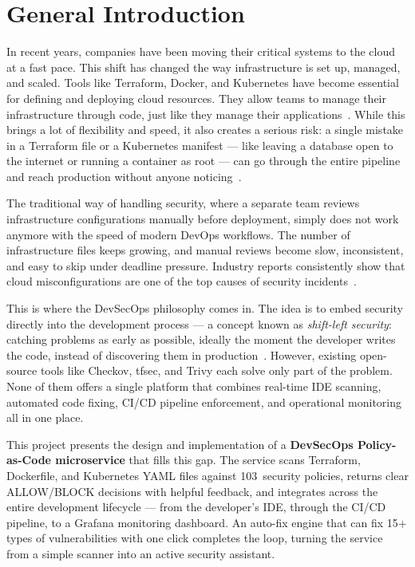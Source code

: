 
\chapter*{General Introduction}

In recent years, companies have been moving their critical systems to the cloud at a fast pace. This shift has changed the way infrastructure is set up, managed, and scaled. Tools like Terraform, Docker, and Kubernetes have become essential for defining and deploying cloud resources. They allow teams to manage their infrastructure through code, just like they manage their applications~\cite{morris2020iac}. While this brings a lot of flexibility and speed, it also creates a serious risk: a single mistake in a Terraform file or a Kubernetes manifest --- like leaving a database open to the internet or running a container as root --- can go through the entire pipeline and reach production without anyone noticing~\cite{aws2024wellarchitected}.

The traditional way of handling security, where a separate team reviews infrastructure configurations manually before deployment, simply does not work anymore with the speed of modern DevOps workflows. The number of infrastructure files keeps growing, and manual reviews become slow, inconsistent, and easy to skip under deadline pressure. Industry reports consistently show that cloud misconfigurations are one of the top causes of security incidents~\cite{rajapakse2022challenges}.

This is where the DevSecOps philosophy comes in. The idea is to embed security directly into the development process --- a concept known as \emph{shift-left security}: catching problems as early as possible, ideally the moment the developer writes the code, instead of discovering them in production~\cite{myrbakken2017devsecops}. However, existing open-source tools like Checkov, tfsec, and Trivy each solve only part of the problem. None of them offers a single platform that combines real-time IDE scanning, automated code fixing, CI/CD pipeline enforcement, and operational monitoring all in one place.

This project presents the design and implementation of a \textbf{DevSecOps Policy-as-Code microservice} that fills this gap. The service scans Terraform, Dockerfile, and Kubernetes YAML files against 103~security policies, returns clear ALLOW/BLOCK decisions with helpful feedback, and integrates across the entire development lifecycle --- from the developer's IDE, through the CI/CD pipeline, to a Grafana monitoring dashboard. An auto-fix engine that can fix 15+ types of vulnerabilities with one click completes the loop, turning the service from a simple scanner into an active security assistant.

